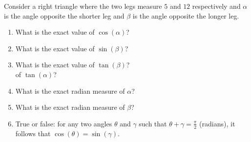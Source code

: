 \documentclass{ximera}
\author{Elizabeth Campolongo}
\begin{document}
\begin{exercise}
Consider a right triangle where the two legs measure $5$ and $12$ respectively and $\alpha$ is the angle opposite the shorter leg and $\beta$ is the angle opposite the longer leg.
%
\begin{enumerate}
\item What is the exact value of $\cos(\alpha)$?
%
\item What is the exact value of $\sin(\beta)$?
%
\item What is the exact value of $\tan(\beta)$? \\ 
of $\tan(\alpha)$?
%
\item What is the exact radian measure of $\alpha$?
%
\item What is the exact radian measure of $\beta$?
%
\item True or false:  for any two angles $\theta$ and $\gamma$ such that $\theta + \gamma = \frac{\pi}{2}$ (radians), it follows that $\cos(\theta) = \sin(\gamma)$.
%
\end{enumerate}
\end{exercise}
\end{document}
